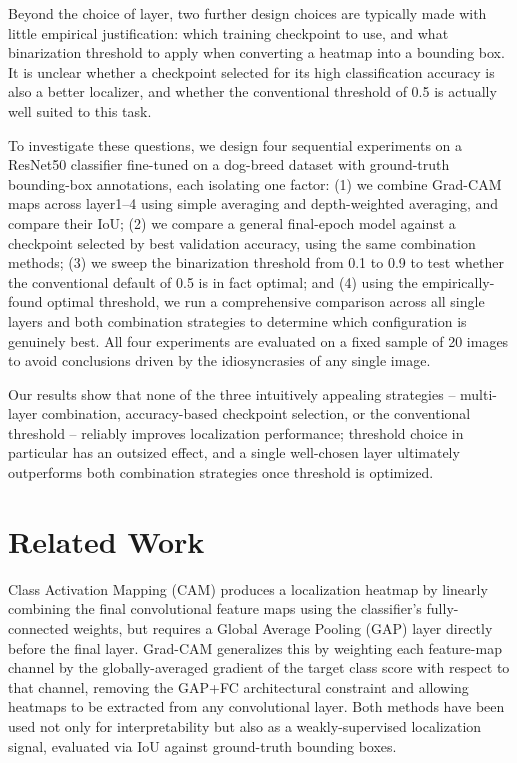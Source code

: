 \documentclass[11pt]{article}
\begin{document}
Beyond the choice of layer, two further design choices are typically made with little empirical justification: which training checkpoint to use, and what binarization threshold to apply when converting a heatmap into a bounding box. It is unclear whether a checkpoint selected for its high classification accuracy is also a better localizer, and whether the conventional threshold of 0.5 is actually well suited to this task.

To investigate these questions, we design four sequential experiments on a ResNet50 classifier fine-tuned on a dog-breed dataset with ground-truth bounding-box annotations, each isolating one factor: (1) we combine Grad-CAM maps across layer1--4 using simple averaging and depth-weighted averaging, and compare their IoU; (2) we compare a general final-epoch model against a checkpoint selected by best validation accuracy, using the same combination methods; (3) we sweep the binarization threshold from 0.1 to 0.9 to test whether the conventional default of 0.5 is in fact optimal; and (4) using the empirically-found optimal threshold, we run a comprehensive comparison across all single layers and both combination strategies to determine which configuration is genuinely best. All four experiments are evaluated on a fixed sample of 20 images to avoid conclusions driven by the idiosyncrasies of any single image.

Our results show that none of the three intuitively appealing strategies -- multi-layer combination, accuracy-based checkpoint selection, or the conventional threshold -- reliably improves localization performance; threshold choice in particular has an outsized effect, and a single well-chosen layer ultimately outperforms both combination strategies once threshold is optimized.

\section{Related Work}

Class Activation Mapping (CAM) \cite{zhou2016cam} produces a localization heatmap by linearly combining the final convolutional feature maps using the classifier's fully-connected weights, but requires a Global Average Pooling (GAP) layer directly before the final layer. Grad-CAM \cite{selvaraju2017gradcam} generalizes this by weighting each feature-map channel by the globally-averaged gradient of the target class score with respect to that channel, removing the GAP+FC architectural constraint and allowing heatmaps to be extracted from any convolutional layer. Both methods have been used not only for interpretability but also as a weakly-supervised localization signal, evaluated via IoU against ground-truth bounding boxes.
\end{document}
